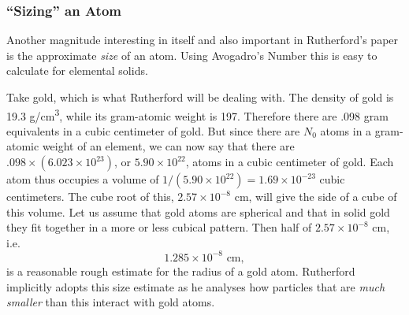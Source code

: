 \subsubsection*{``Sizing'' an Atom}

Another magnitude interesting in itself and also important in
Rutherford's paper is the approximate \emph{size} of an atom. Using
Avogadro's Number this is easy to calculate for elemental solids.

Take gold, which is what Rutherford will be dealing with. The density of
gold is 19.3 g/cm\textsuperscript{3}, while its gram-atomic weight is
197. Therefore there are .098 gram equivalents in a cubic centimeter of
gold. But since there are $N_0$ atoms in a gram-atomic weight of an
element, we can now say that there are $.098 \times (6.023 \times 10^{23})$, or $5.90 \times
10^{22}$, atoms in a cubic centimeter of gold. Each atom
thus occupies a volume of $1/(5.90 \times 10^{22}) = 1.69 \times
10^{-23}$ cubic centimeters. The cube root of this, $2.57 \times
10^{-8}$ cm, will give the side of a cube of this volume.
Let us assume that gold atoms are spherical and that in solid gold they
fit together in a more or less cubical pattern. Then half of $2.57 \times
10^{-8}$ cm, i.e.\ 
\begin{equation*}
1.285 \times 10^{-8} \text{ cm},
\end{equation*}
is a reasonable rough estimate for the radius of a gold atom. Rutherford
implicitly adopts this size estimate as he analyses how particles that
are \emph{much smaller} than this interact with gold atoms.
